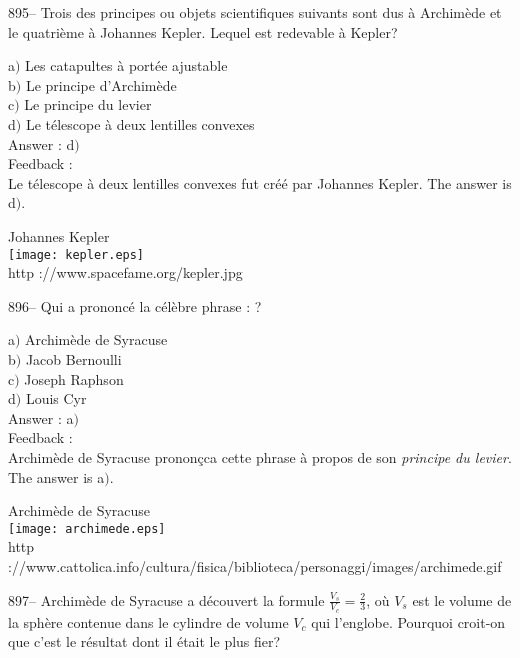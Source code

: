 \documentclass[letterpaper, 12pt]{article}
\begin{document}
895-- Trois des principes ou objets scientifiques suivants sont dus
\`a Archim\`ede et le quatri\`eme \`a Johannes Kepler. Lequel est
redevable \`a Kepler?

a$)$ Les catapultes \`a port\'ee ajustable\\
b$)$ Le principe d'Archim\`ede \\
c$)$ Le principe du levier \\
d$)$ Le t\'elescope \`a deux lentilles convexes \\

Answer : d$)$\\

Feedback : \\
Le t\'elescope \`a deux lentilles convexes fut cr\'e\'e par
Johannes Kepler. The answer is d$)$.\\

        \begin{center}
        Johannes Kepler\\
    \texttt{[image: kepler.eps]}\\
        {\footnotesize http ://www.spacefame.org/kepler.jpg}
    \end{center}

896-- Qui a prononc\'e la c\'el\`ebre phrase : \fg ?

a$)$ Archim\`ede de Syracuse\\
b$)$ Jacob Bernoulli \\
c$)$ Joseph Raphson \\
d$)$ Louis Cyr \\

Answer : a$)$\\

Feedback : \\
Archim\`ede de Syracuse pronon\c cca cette phrase \`a propos de son {\sl
principe du levier}. The answer is a$)$.\\

        \begin{center}
        Archim\`ede de Syracuse\\
    \texttt{[image: archimede.eps]}\\
        {\footnotesize http
://www.cattolica.info/cultura/fisica/biblioteca/personaggi/images/archimede.gif}
    \end{center}

897-- Archim\`ede de Syracuse a d\'ecouvert la formule
$\frac{V_s}{V_c}=\frac23$, o\`u $V_s$ est le volume de la sph\`ere
contenue dans le cylindre de volume $V_c$ qui l'englobe. Pourquoi
croit-on que c'est le r\'esultat dont il \'etait le plus fier?
\end{document}
